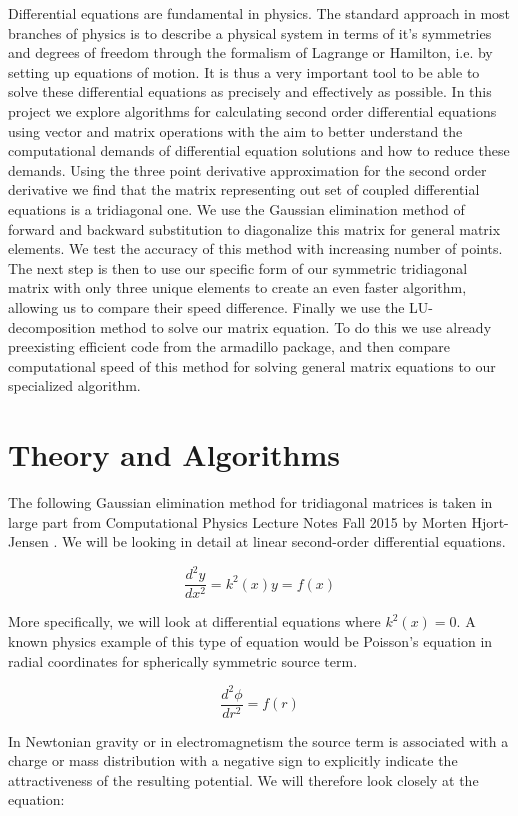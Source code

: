 \documentclass[a4paper,11pt]{article}
\begin{document}
{Differential equations are fundamental in physics. The standard approach in most branches of physics is to describe a physical system in terms of it's symmetries and degrees of freedom through the formalism of Lagrange or Hamilton, i.e. by setting up equations of motion. It is thus a very important tool to be able to solve these differential equations as precisely and effectively as possible. In this project we explore algorithms for calculating second order differential equations using vector and matrix operations with the aim to better understand the computational demands of differential equation solutions and how to reduce these demands. Using the three point derivative approximation for the second order derivative we find that the matrix representing out set of coupled differential equations is a tridiagonal one. We use the Gaussian elimination method of forward and backward substitution to diagonalize this matrix for general matrix elements. We test the accuracy of this method with increasing number of points. The next step is then to use our specific form of our symmetric tridiagonal matrix with only three unique elements to create an even faster algorithm, allowing us to compare their speed difference. Finally we use the LU-decomposition method to solve our matrix equation. To do this we use already preexisting efficient code from the armadillo package, and then compare computational speed of this method for solving general matrix equations to our specialized algorithm.
		
		
		
\section*{Theory and Algorithms}
		
The following Gaussian elimination method for tridiagonal matrices is taken in large part from Computational Physics Lecture Notes Fall 2015 by Morten Hjort-Jensen \cite{M.Hjort-Jensen_CompFys}. We will be looking in detail at linear second-order differential equations.
		
$$\frac{d^2y}{dx^2} = k^2(x) y = f(x)$$
		
More specifically, we will look at differential equations where $k^2(x) = 0$. A known physics example of this type of equation would be Poisson's equation in radial coordinates for spherically symmetric source term.
		
$$\frac{d^2 \phi}{d r^2} = f(r)$$
		
In Newtonian gravity or in electromagnetism the source term is associated with a charge or mass distribution with a negative sign to explicitly indicate the attractiveness of the resulting potential. We will therefore look closely at the equation:
		
}
\end{document}
